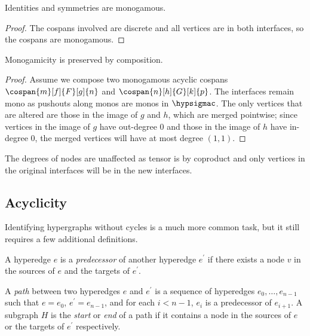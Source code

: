 \begin{lemma}\label{lem:identities-symmetries-monogamous}
    Identities and symmetries are monogamous.
\end{lemma}
\begin{proof}
    The cospans involved are discrete and all vertices are in both
    interfaces, so the cospans are monogamous.
\end{proof}

\begin{lemma}\label{lem:monogamicity-preserved-composition}
    Monogamicity is preserved by composition.
\end{lemma}
\begin{proof}
    Assume we compose two monogamous acyclic cospans \(
    \cospan{m}[f]{F}[g]{n}
    \) and \(
    \cospan{n}[h]{G}[k]{p}
    \).
    The interfaces remain mono as pushouts along monos are monos in
    \(\hypsigmac\). The only vertices that are altered are those in the image of
    \(g\) and \(h\), which are merged pointwise; since vertices in the image of
    \(g\) have out-degree \(0\) and those in the image of \(h\) have in-degree
    \(0\), the merged vertices will have at most degree \((1, 1)\).
\end{proof}

\begin{lemma}\label{lem:monogamicity-preserved-tensor}
    The degrees of nodes are unaffected as tensor is by coproduct and
    only vertices in the original interfaces will be in the new interfaces.
\end{lemma}

\subsection{Acyclicity}

Identifying hypergraphs without cycles is a much more common task, but it still
requires a few additional definitions.

\begin{definition}
    A hyperedge \(e\) is a \emph{predecessor} of another hyperedge \(e^\prime\)
    if there exists a node \(v\) in the sources of \(e\) and the targets of
    \(e^\prime\).
\end{definition}

\begin{definition}
    A \emph{path} between two hyperedges \(e\) and \(e^\prime\) is a sequence of
    hyperedges \(e_0, \dots, e_{n-1}\) such that \(e = e_0\),
    \(e^\prime = e_{n-1}\), and for each \(i < n-1\), \(e_i\) is a predecessor
    of \(e_{i+1}\).
    A subgraph \(H\) is the \emph{start} or \emph{end} of a path if it contains
    a node in the sources of \(e\) or the targets of \(e^\prime\) respectively.
\end{definition}

